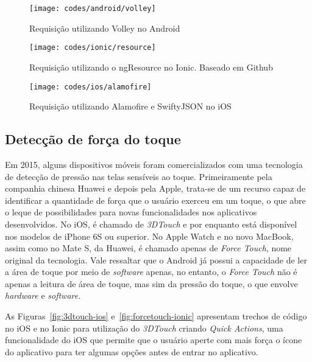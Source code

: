 \begin{figure}[H]
	\centering
	\texttt{[image: codes/android/volley]}
	\caption[Requisição utilizando Volley no Android]{Requisição utilizando Volley no Android}
	\label{fig:volley-android}
\end{figure}
\begin{figure}[H]
	\centering
	\texttt{[image: codes/ionic/resource]}
	\caption[Requisição utilizando o ngResource no Ionic]{Requisição utilizando o ngResource no Ionic. Baseado em Github\protect\footnotemark}
	\label{fig:resource-ionic}
\end{figure}
\begin{figure}[H]
	\centering
	\texttt{[image: codes/ios/alamofire]}
	\caption[Requisição utilizando Alamofire e SwiftyJSON no iOS]{Requisição utilizando Alamofire e SwiftyJSON no iOS}
	\label{fig:alamofire-ios}
\end{figure} 

\subsection{Detecção de força do toque} \label{subsec:forcetouch}
Em 2015, alguns dispositivos móveis foram comercializados com uma tecnologia de detecção de pressão nas telas sensíveis ao toque. Primeiramente pela companhia chinesa Huawei e depois pela Apple, trata-se de um recurso 
capaz de identificar a quantidade de força que o usuário exerceu em um toque, o que abre o leque de possibilidades para novas funcionalidades nos aplicativos desenvolvidos. 
No iOS, é chamado de \textit{3DTouch} e por enquanto está disponível nos modelos de iPhone 6S ou superior. No Apple Watch e no novo MacBook, assim como no Mate S, da Huawei, é chamado apenas de \textit{Force Touch}, 
nome original da tecnologia. 
Vale ressaltar que o Android já possui a capacidade de ler a área de toque por meio de \textit{software} apenas, no entanto, o \textit{Force Touch} não é apenas a leitura de área de toque, mas sim da pressão do toque,
o que envolve \textit{hardware} e \textit{software}.

As Figuras~\ref{fig:3dtouch-ios} e~\ref{fig:forcetouch-ionic} apresentam trechos de código no iOS e no Ionic para utilização do \textit{3DTouch} criando \textit{Quick Actions}, uma funcionalidade do iOS que permite 
que o usuário aperte com mais força o ícone do aplicativo para ter algumas opções antes de entrar no aplicativo.

